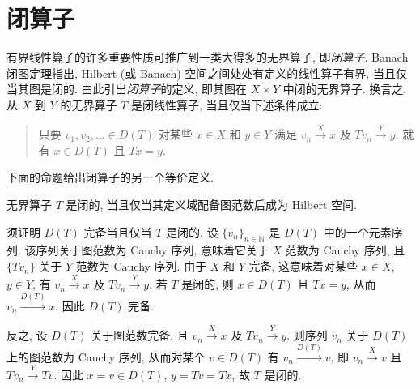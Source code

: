 \section{{闭算子}}\label{sec:closed-operators}

{有界线性算子的许多重要性质可推广到一类大得多的无界算子, 即\emph{闭算子}. Banach 闭图定理指出, Hilbert (或 Banach) 空间之间处处有定义的线性算子有界, 当且仅当其图是闭的. 由此引出\emph{闭算子}的定义, 即其图在 $X\times Y$ 中闭的无界算子. 换言之, 从 $X$ 到 $Y$ 的无界算子 $T$ 是闭线性算子, 当且仅当下述条件成立:}

\begin{quote}
{只要 $v_1,v_2,\ldots\in D(T)$ 对某些 $x\in X$ 和 $y\in Y$ 满足 $v_n\xrightarrow{X}x$ 及 $Tv_n\xrightarrow{Y}y$, 就有 $x\in D(T)$ 且 $Tx=y$.}
\end{quote}

{下面的命题给出闭算子的另一个等价定义.}


\begin{Proposition}\label{prop:closed-graph-domain-complete}
{无界算子 $T$ 是闭的, 当且仅当其定义域配备图范数后成为 Hilbert 空间.}
\end{Proposition}

\begin{Proof}
{须证明 $D(T)$ 完备当且仅当 $T$ 是闭的. 设 $\{v_n\}_{n\in\mathbb N}$ 是 $D(T)$ 中的一个元素序列. 该序列关于图范数为 Cauchy 序列, 意味着它关于 $X$ 范数为 Cauchy 序列, 且 $\{Tv_n\}$ 关于 $Y$ 范数为 Cauchy 序列. 由于 $X$ 和 $Y$ 完备, 这意味着对某些 $x\in X$, $y\in Y$, 有 $v_n\xrightarrow{X}x$ 及 $Tv_n\xrightarrow{Y}y$. 若 $T$ 是闭的, 则 $x\in D(T)$ 且 $Tx=y$, 从而 $v_n\xrightarrow{D(T)}x$. 因此 $D(T)$ 完备.}

{反之, 设 $D(T)$ 关于图范数完备, 且 $v_n\xrightarrow{X}x$ 及 $Tv_n\xrightarrow{Y}y$. 则序列 $v_n$ 关于 $D(T)$ 上的图范数为 Cauchy 序列, 从而对某个 $v\in D(T)$ 有 $v_n\xrightarrow{D(T)}v$, 即 $v_n\xrightarrow{X}v$ 且 $Tv_n\xrightarrow{Y}Tv$. 因此 $x=v\in D(T)$, $y=Tv=Tx$, 故 $T$ 是闭的.}
\end{Proof}
